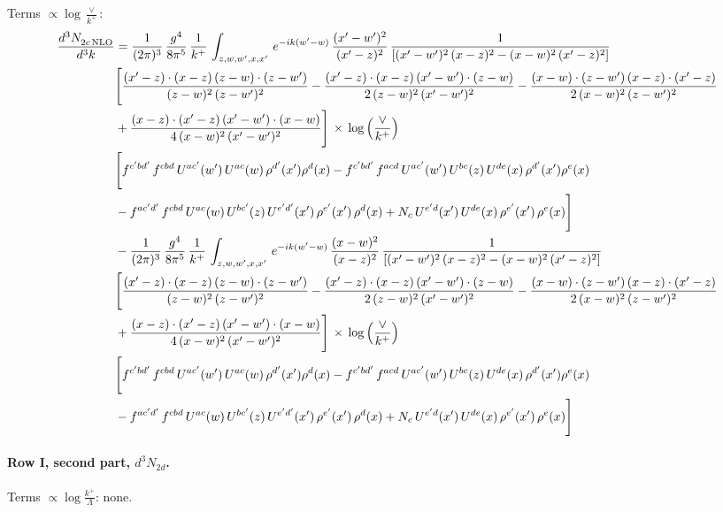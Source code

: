 \documentclass[10pt]{article}
\numberwithin{equation}{section}
\begin{document}
\noindent Terms $\propto\log\frac{\vee}{k^+}$:
\begin{align}
    \frac{d^{3}N_{2c\,\rm NLO}^{\rm}}{d^{3}k}  & =  \frac{1}{(2\pi)^{3}}\, \frac{g^{4}}{8\pi^{5}}\,\frac{1}{k^{+}}\,\int_{z,w,w^{\prime},x,x'}\, e^{-ik(w^{\prime}-w)}\,\frac{(x'-w')^{2}}{(x'-z)^{2}}\, \frac{1}{\left[(x'-w')^{2}\, (x-z)^{2} - (x-w)^{2}\, (x'-z)^{2}\right]} \notag \\ & \Bigg[\frac{(x'-z)\cdot (x-z)\, (z-w)\cdot (z-w')}{(z-w)^{2}\, (z-w')^{2}}-\frac{(x'-z)\cdot (x-z)\, (x'-w')\cdot (z-w)}{2\, (z-w)^{2}\, (x'-w')^{2}} -\frac{(x-w)\cdot (z-w')\, (x-z)\cdot (x'-z)}{2\, (x-w)^{2}\, (z-w')^{2}}\notag \\ & +\frac{(x-z)\cdot (x'-z)\, (x'-w')\cdot (x-w)}{4\, (x-w)^{2}\, (x'-w')^{2}}\Bigg]\,\times\, \log{\left(\frac{\vee}{k^{+}}\right)} \notag \\ &  \Bigg[f^{c'bd'}\,f^{cbd}\, U^{ac'}(w')\,U^{ac}(w)\,\rho^{d'}(x')\rho^{d}(x)- f^{c'bd'}\,f^{acd}\,U^{ac'}(w')\,U^{bc}(z)\,U^{de}(x)\,\rho^{d'}(x')\rho^{e}(x) \notag \\ & -f^{ac'd'}\,f^{cbd}\,U^{ac}(w)\,U^{bc'}(z)\,U^{e'd'}(x')\,\rho^{e'}(x')\,\rho^{d}(x) +N_{c}\,U^{e'd}(x')\,U^{de}(x)\,\rho^{e'}(x')\,\rho^{e}(x)\Bigg] \notag \\
& -\frac{1}{(2\pi)^{3}}\, \frac{g^{4}}{8\pi^{5}}\,\frac{1}{k^{+}}\,\int_{z,w,w^{\prime},x,x'}\, e^{-ik(w^{\prime}-w)}\,\frac{(x-w)^{2}}{(x-z)^{2}}\, \frac{1}{\left[(x'-w')^{2}\, (x-z)^{2} - (x-w)^{2}\, (x'-z)^{2}\right]} \notag \\ & \Bigg[\frac{(x'-z)\cdot (x-z)\, (z-w)\cdot (z-w')}{(z-w)^{2}\, (z-w')^{2}}-\frac{(x'-z)\cdot (x-z)\, (x'-w')\cdot (z-w)}{2\, (z-w)^{2}\, (x'-w')^{2}} -\frac{(x-w)\cdot (z-w')\, (x-z)\cdot (x'-z)}{2\, (x-w)^{2}\, (z-w')^{2}}\notag \\ & +\frac{(x-z)\cdot (x'-z)\, (x'-w')\cdot (x-w)}{4\, (x-w)^{2}\, (x'-w')^{2}}\Bigg]\,\times\, \log{\left(\frac{\vee}{k^{+}}\right)} \notag \\ &  \Bigg[f^{c'bd'}\,f^{cbd}\, U^{ac'}(w')\,U^{ac}(w)\,\rho^{d'}(x')\rho^{d}(x)- f^{c'bd'}\,f^{acd}\,U^{ac'}(w')\,U^{bc}(z)\,U^{de}(x)\,\rho^{d'}(x')\rho^{e}(x) \notag \\ & -f^{ac'd'}\,f^{cbd}\,U^{ac}(w)\,U^{bc'}(z)\,U^{e'd'}(x')\,\rho^{e'}(x')\,\rho^{d}(x) +N_{c}\,U^{e'd}(x')\,U^{de}(x)\,\rho^{e'}(x')\,\rho^{e}(x)\Bigg] \label{eq:B:G2I2c}
\end{align}

\paragraph{Row I, second part, $d^3N_{2d}$.}
\noindent Terms $\propto\log\frac{k^+}{\Lambda}$: none.
\end{document}
